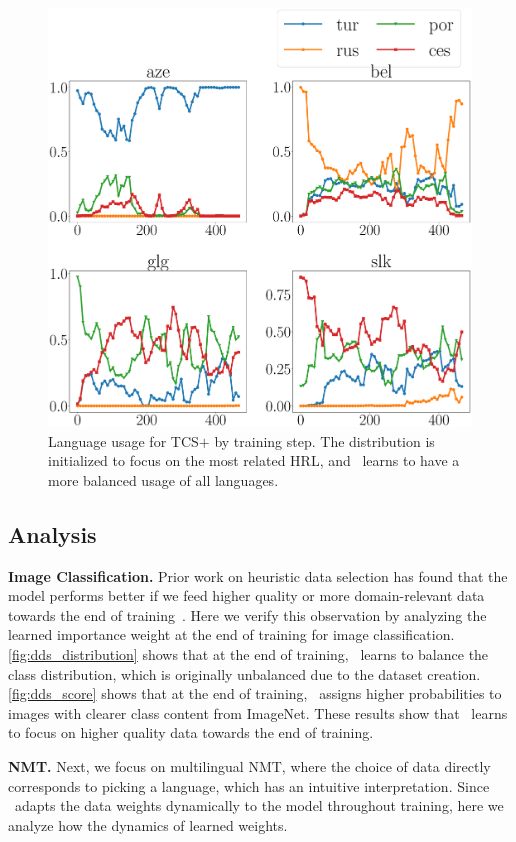 \begin{figure}
    \centering
    \includegraphics[width=0.9\columnwidth]{figs/hs_prob_plot.eps}
    \caption{\label{fig:nmt_distrib_hs}Language usage for TCS$+$\dds{} by training step. The distribution is initialized to focus on the most related HRL, and \dds~learns to have a more balanced usage of all languages.}
\end{figure}

\subsection{Analysis}


\textbf{Image Classification.} Prior work on heuristic data selection has found that the model performs better if we feed higher quality or more domain-relevant data  towards the end of training~\citep{dynamic_data_selection_nmt,dynamic}. Here we verify this observation by analyzing the learned importance weight at the end of training for image classification. \autoref{fig:dds_distribution} shows that at the end of training, \dds~learns to balance the class distribution, which is originally unbalanced due to the dataset creation. \autoref{fig:dds_score} shows that at the end of training, \dds~assigns higher probabilities to images with clearer class content from ImageNet. These results show that \dds~learns to focus on higher quality data towards the end of training.  


\textbf{NMT.}
Next, we focus on multilingual NMT, where the choice of data directly corresponds to picking a language, which has an intuitive interpretation. Since \dds~adapts the data weights dynamically to the model throughout training, here we analyze how the dynamics of learned weights.

